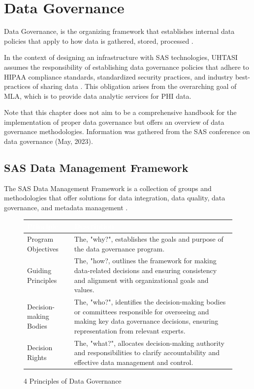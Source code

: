\section{Data Governance} \label{section: DATAG}

Data Governance, is the organizing framework that establishes internal data policies that apply to how data is gathered, stored, processed \cite{Google}. 

In the context of designing an infrastructure with SAS technologies, UHTASI assumes the responsibility of establishing data governance policies that adhere to HIPAA compliance standards, standardized security practices, and industry best-practices of sharing data \cite{Khatri}. This obligation arises from the overarching goal of MLA, which is to provide data analytic services for PHI data.

Note that this chapter does not aim to be a comprehensive handbook for the implementation of proper data governance but offers an overview of data governance methodologies. Information was gathered from the SAS conference on data governance (May, 2023).

\subsection{SAS Data Management Framework}
The SAS Data Management Framework is a collection of groups and methodologies that offer solutions for data integration, data quality, data governance, and metadata management \cite{Teachey}. 

\begin{figure}[H]
\begin{center}
    \renewcommand{\arraystretch}{1.5}
    \begin{tabular}{|>{\raggedright\arraybackslash}m{3.5cm}
                    |>{\raggedright\arraybackslash}m{11.5cm}
                    |}
    \hline
    \rowcolor[HTML]{196fb4}\centering\textcolor{white}{\large Principle} 
                            & \centering\textcolor{white}{\large Description} 
                            \tabularnewline 
    \hline
    Program Objectives & The, "why?", establishes the goals and purpose of the data governance program. \\\hline
    Guiding Principles & The, "how?, outlines the framework for making data-related decisions and ensuring consistency and alignment with organizational goals and values. \\\hline
    Decision-making Bodies & The, "who?", identifies the decision-making bodies or committees responsible for overseeing and making key data governance decisions, ensuring representation from relevant experts. \\\hline
    Decision Rights & The, "what?", allocates decision-making authority and responsibilities to clarify accountability and effective data management and control. \\\hline
    \end{tabular}
\end{center}
\caption{4 Principles of Data Governance}
\label{4 DG Principles}
\end{figure}

